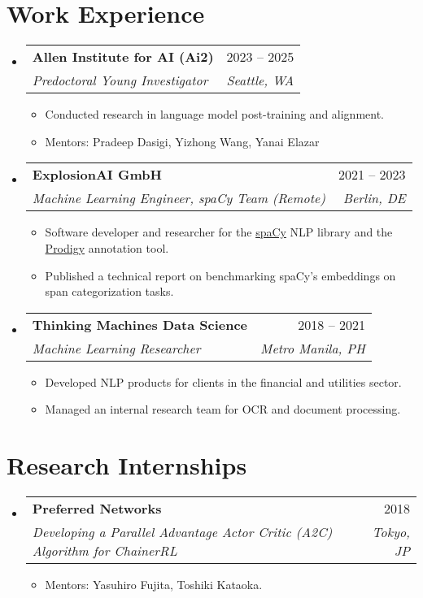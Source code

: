 \documentclass[a4paper,11pt]{article}
\makeatletter
\newcommand{\resumeItem}[1]{
  \item\small{
    {#1 \vspace{-2pt}}
  }
}
\newcommand{\resumeSubheading}[4]{
  \vspace{-2pt}\item
    \begin{tabular*}{0.97\textwidth}[t]{l@{\extracolsep{\fill}}r}
      \textbf{#1} & #2 \\
      \textit{\small#3} & \textit{\small #4} \\
    \end{tabular*}\vspace{-7pt}
}
\newcommand{\resumeProjectHeading}[2]{
    \item
    \begin{tabular*}{0.97\textwidth}{l@{\extracolsep{\fill}}r}
      \small#1 & #2 \\
    \end{tabular*}\vspace{-7pt}
}
\newcommand{\resumeSubHeadingListStart}{\begin{itemize}[leftmargin=0.15in, label={}]}
\newcommand{\resumeSubHeadingListEnd}{\end{itemize}}
\newcommand{\resumeItemListStart}{\begin{itemize}}
\newcommand{\resumeItemListEnd}{\end{itemize}\vspace{-5pt}}
\makeatother
\begin{document}
\section{Work Experience}
\resumeSubHeadingListStart

\resumeSubheading
{Allen Institute for AI (Ai2)}{2023 -- 2025}
{Predoctoral Young Investigator}{Seattle, WA}
\resumeItemListStart
\resumeItem{Conducted research in language model post-training and alignment.}
\resumeItem{Mentors: Pradeep Dasigi, Yizhong Wang, Yanai Elazar}
\resumeItemListEnd

\resumeSubheading
{ExplosionAI GmbH}{2021 -- 2023}
{Machine Learning Engineer, spaCy Team (Remote)}{Berlin, DE}
\resumeItemListStart
\resumeItem{Software developer and researcher for the \href{https://spacy.io}{spaCy} NLP library and the \href{https://prodigy.ai}{Prodigy} annotation tool.}
\resumeItem{Published a technical report on benchmarking spaCy's embeddings on span categorization tasks.}
\resumeItemListEnd

\resumeSubheading
{Thinking Machines Data Science}{2018 -- 2021}
{Machine Learning Researcher}{Metro Manila, PH}
\resumeItemListStart
\resumeItem{Developed NLP products for clients in the financial and utilities sector.}
\resumeItem{Managed an internal research team for OCR and document processing.}
\resumeItemListEnd

\resumeSubHeadingListEnd

\section{Research Internships}
\resumeSubHeadingListStart


\resumeSubheading
{Preferred Networks}{2018}
{Developing a Parallel Advantage Actor Critic (A2C) Algorithm for ChainerRL}{Tokyo, JP}
\resumeItemListStart
\resumeItem{Mentors: Yasuhiro Fujita, Toshiki Kataoka.}
\resumeItemListEnd

\resumeSubHeadingListEnd

\end{document}
